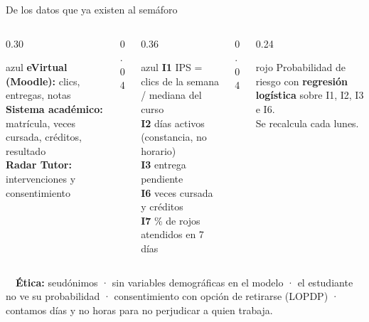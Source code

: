 \documentclass[aspectratio=169,10pt]{beamer}
\newcommand{\bloque}{}
\newcommand{\setbloque}[1]{\renewcommand{\bloque}{#1}}
\begin{document}
\setbloque{2 · Datos e indicadores · 1 min}
\begin{frame}{De los datos que ya existen al semáforo}
\begin{columns}[c]
\begin{column}{0.30\textwidth}
\begin{tarjeta}{azul}\footnotesize
\textbf{eVirtual (Moodle):} clics, entregas, notas\\[3pt]
\textbf{Sistema académico:} matrícula, veces cursada, créditos, resultado\\[3pt]
\textbf{Radar Tutor:} intervenciones y consentimiento
\end{tarjeta}
\end{column}
\begin{column}{0.04\textwidth}\centering\color{azul}\Large\faArrowRight\end{column}
\begin{column}{0.36\textwidth}
\begin{tarjeta}{azul}\footnotesize
\textbf{I1} IPS = clics de la semana / mediana del curso\\[2pt]
\textbf{I2} días activos (constancia, no horario)\\[2pt]
\textbf{I3} entrega pendiente\\[2pt]
\textbf{I6} veces cursada y créditos\\[2pt]
\textbf{I7} \% de rojos atendidos en 7 días
\end{tarjeta}
\end{column}
\begin{column}{0.04\textwidth}\centering\color{azul}\Large\faArrowRight\end{column}
\begin{column}{0.24\textwidth}
\begin{tarjeta}{rojo}\footnotesize
Probabilidad de riesgo con \textbf{regresión logística} sobre I1, I2, I3 e I6.\\[3pt]
Se recalcula cada lunes.
\end{tarjeta}
\end{column}
\end{columns}
\vspace{6pt}
\begin{tcolorbox}[colback=fondo,colframe=fondo,arc=2pt,left=8pt]
\footnotesize\faUserShield\ \ \textbf{Ética:} seudónimos · sin variables demográficas en el modelo · el estudiante no ve su probabilidad · consentimiento con opción de retirarse (LOPDP) · contamos días y no horas para no perjudicar a quien trabaja.
\end{tcolorbox}
\end{frame}
\end{document}
